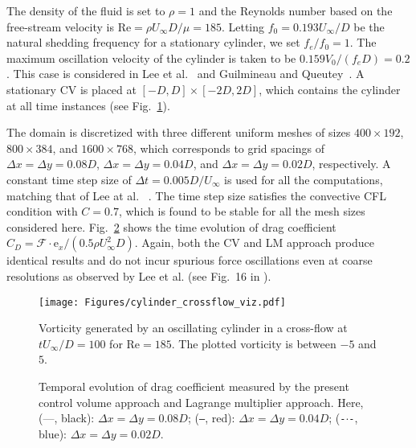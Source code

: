 \documentclass[review]{elsarticle}
\renewcommand{\vec}[1]{\bm{\mathrm{#1}}}
\def \e{\vec{e}}
\def \cF{\vec{\mathcal{F}}}
\def \e{\vec{e}}
\def \Re{\text{Re}}
\def \dt{\Delta t}
\def \dx{\Delta x}
\def \dy{\Delta y}
\def \dt{\Delta t}
\def \dx{\Delta x}
\newcommand{\REVIEW}[1]{{#1}}
\begin{document}
The density of the fluid is set to $\rho = 1$ and the Reynolds number based on 
the free-stream velocity is $\Re = \rho U_{\infty} D/\mu = 185$.
Letting $f_0 = 0.193 U_{\infty}/D$ be the natural shedding frequency for a stationary cylinder,
we set $f_e/f_0 = 1$. The maximum oscillation velocity of the cylinder is taken to be
$0.159 V_0/(f_e D) = 0.2$. This case is considered in Lee et al.~\cite{Lee11} and 
Guilmineau and Queutey~\cite{Guilmineau02}. A stationary CV is placed at $[-D,D]\times[-2D,2D]$, 
which contains the cylinder at all time instances (see Fig.~\ref{fig_oscillating_cylinder_crossflow_viz}).

The domain is discretized with three different uniform meshes of sizes $400 \times 192$, $800
\times 384$, and $1600 \times 768$, which corresponds to grid spacings of $\dx = \dy = 0.08D$,
$\dx = \dy = 0.04D$, and $\dx = \dy = 0.02D$, respectively. A constant time step size of $\dt  = 0.005 
D/U_{\infty}$ is used for all the computations, matching that of Lee at al. ~\cite{Lee11}. 
\REVIEW{The time step size satisfies the convective CFL condition with $C = 0.7$, which is found to be stable for
all the mesh sizes considered here.}
Fig.~\ref{fig_oscillating_cylinder_crossflow} shows
the time evolution of drag coefficient $C_D = \cF \cdot \e_x/(0.5 \rho U_{\infty}^2D)$. Again, both
the CV and LM approach produce identical results  and do not incur spurious force oscillations 
even at coarse resolutions as observed by Lee et al. (see Fig.~16 in \cite{Lee11}).

\begin{figure}[H]
  \centering
    \texttt{[image: Figures/cylinder\_crossflow\_viz.pdf]}
  \caption{ Vorticity generated by an oscillating cylinder in a cross-flow at $t U_{\infty}/D = 100$ for $\Re = 185$.
  The plotted vorticity is between $-5$ and $5$.}
   \label{fig_oscillating_cylinder_crossflow_viz}
  \end{figure}

\begin{figure}[H]
  \caption{
   Temporal evolution of drag coefficient measured by the 
    present control volume approach and
     Lagrange multiplier approach.
    Here, (---, black): $\dx = \dy = 0.08D$;
    (\texttt{---}, red): $\dx = \dy = 0.04D$;
    (\texttt{-}$\cdot$\texttt{-}, blue): $\dx = \dy = 0.02D$.}
  \label{fig_oscillating_cylinder_crossflow}
\end{figure}
\end{document}
